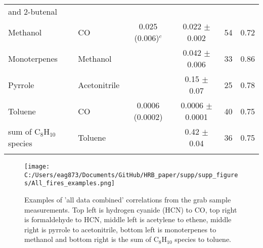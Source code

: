 \documentclass[acp, manuscript]{copernicus}
\begin{document}
\begin{table}
\begin{tabular}{l l c c  l l }
    and 2-butenal& & & & & \\
    Methanol & CO & 0.025 (0.006)$^c$ & 0.022 $\pm$ 0.002 &54& 0.72\\
    Monoterpenes & Methanol & &0.042 $\pm$ 0.006 &33& 0.86 \\
    Pyrrole & Acetonitrile & &0.15 $\pm$ 0.07 &25& 0.78 \\
    Toluene& CO & 0.0006 (0.0002) & 0.0006 $\pm$ 0.0001 &40& 0.75 \\
    sum of C$_8$H$_{10}$ species& Toluene & & 0.42 $\pm$ 0.04 &36& 0.75 \\
    \bottomhline
  \end{tabular}
  \label{table:grab}
\end{table}

\begin{figure}
  \texttt{[image: C:/Users/eag873/Documents/GitHub/HRB\_paper/supp/supp\_figures/All\_fires\_examples.png]}
  \caption{Examples of 'all data combined' correlations from the grab sample measurements. Top left is hydrogen cyanide (HCN) to CO, top right is formaldehyde to HCN, middle left is acetylene to ethene, middle right is pyrrole to acetonitrile, bottom left is monoterpenes to methanol and bottom right is the sum of C$_8$H$_{10}$ species to toluene.}
  \label{fig:all_data}
\end{figure}
\end{document}
